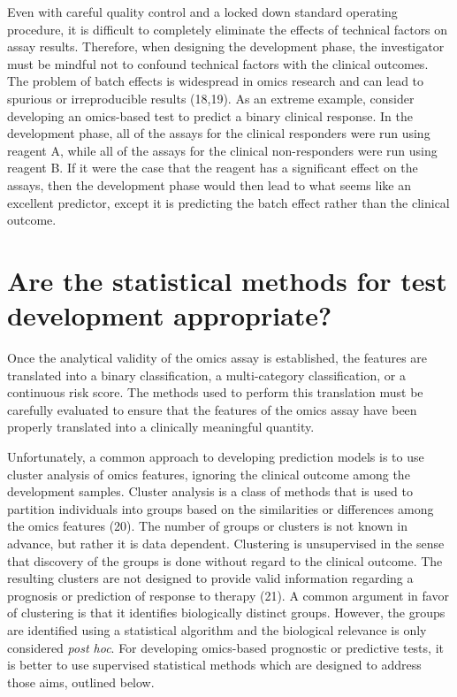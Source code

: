 \documentclass[11pt]{article}
\begin{document}
Even with careful quality control and a locked down standard operating
procedure, it is difficult to completely eliminate the effects of
technical factors on assay results. Therefore, when designing the
development phase, the investigator must be mindful not to confound
technical factors with the clinical outcomes. The problem of batch
effects is widespread in omics research and can lead to spurious or
irreproducible results (18,19). As an extreme example, consider
developing an omics-based test to predict a binary clinical response. In
the development phase, all of the assays for the clinical responders
were run using reagent A, while all of the assays for the clinical
non-responders were run using reagent B. If it were the case that the
reagent has a significant effect on the assays, then the development
phase would then lead to what seems like an excellent predictor, except
it is predicting the batch effect rather than the clinical outcome.

\section{Are the statistical methods for test development
appropriate?}\label{are-the-statistical-methods-for-test-development-appropriate}

Once the analytical validity of the omics assay is established, the
features are translated into a binary classification, a multi-category
classification, or a continuous risk score. The methods used to perform
this translation must be carefully evaluated to ensure that the features
of the omics assay have been properly translated into a clinically
meaningful quantity.

Unfortunately, a common approach to developing prediction models is to
use cluster analysis of omics features, ignoring the clinical outcome
among the development samples. Cluster analysis is a class of methods
that is used to partition individuals into groups based on the
similarities or differences among the omics features (20). The number of
groups or clusters is not known in advance, but rather it is data
dependent. Clustering is unsupervised in the sense that discovery of the
groups is done without regard to the clinical outcome. The resulting
clusters are not designed to provide valid information regarding a
prognosis or prediction of response to therapy (21). A common argument
in favor of clustering is that it identifies biologically distinct
groups. However, the groups are identified using a statistical algorithm
and the biological relevance is only considered \emph{post hoc}. For
developing omics-based prognostic or predictive tests, it is better to
use supervised statistical methods which are designed to address those
aims, outlined below.
\end{document}
